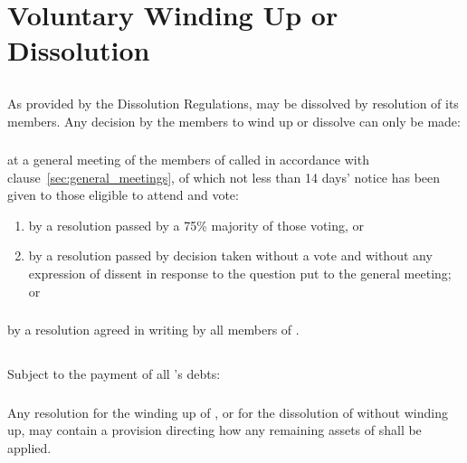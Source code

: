 \section{Voluntary Winding Up or Dissolution}\label{sec:dissolution}

    \subsection{}
    As provided by the Dissolution Regulations, \shortname{} may be dissolved by resolution of its members. Any decision by the members to wind up or dissolve \shortname{} can only be made:

        \subsubsection{}
        at a general meeting of the members of \shortname{} called in accordance with clause~\ref{sec:general_meetings}, of which not less than 14 days' notice has been given to those eligible to attend and vote:
        \begin{enumerate}
            \item by a resolution passed by a 75\% majority of those voting, or
            \item by a resolution passed by decision taken without a vote and without any expression of dissent in response to the question put to the general meeting; or
        \end{enumerate}

        \subsubsection{}
        by a resolution agreed in writing by all members of \shortname{}.

    \subsection{}
    Subject to the payment of all \shortname{}’s debts:

        \subsubsection{}
        Any resolution for the winding up of \shortname{}, or for the dissolution of \shortname{} without winding up, may contain a provision directing how any remaining assets of \shortname{} shall be applied.

